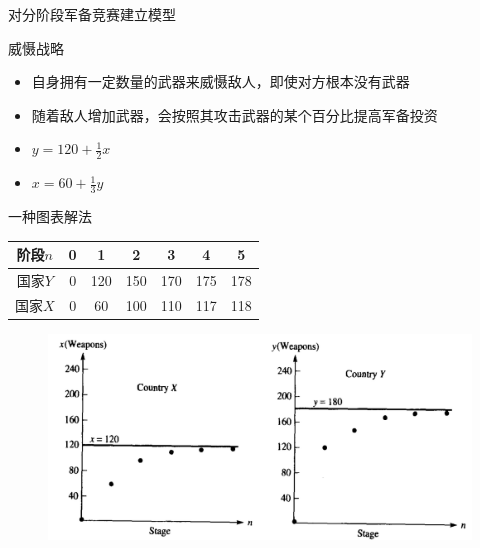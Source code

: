 \documentclass[UTF8]{ctexbeamer}
\begin{document}
\begin{frame}{对分阶段军备竞赛建立模型}
  \begin{block}{威慑战略}
    \begin{itemize}
    \item 自身拥有一定数量的武器来威慑敌人，即使对方根本没有武器
    \item 随着敌人增加武器，会按照其攻击武器的某个百分比提高军备投资
    \end{itemize}
  \end{block}
  \begin{itemize}
  \item $y = 120 + \frac{1}{2}x$
  \item $x = 60 + \frac{1}{3}y$
  \end{itemize}

\end{frame}

\begin{frame}{一种图表解法}
  \begin{table}
    \centering
    \begin{tabular}{c|cccccc}
      阶段$n$ & 0 & 1 & 2 & 3 & 4 & 5\\
      \hline
      国家$Y$ & 0 & 120 & 150 & 170 & 175 & 178\\
      国家$X$ & 0 & 60 & 100 & 110 & 117 & 118
    \end{tabular}
  \end{table}

  \begin{figure}
    \centering
    \includegraphics[width=.7\textwidth]{dar.png}
  \end{figure}
  
\end{frame}
\end{document}
